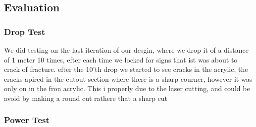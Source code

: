 \subsection{Evaluation}
\subsubsection{Drop Test}
We did testing on the last iteration of our desgin, where we drop it of a distance of 1 meter 10 times, efter each time we locked for signs that ist was about to crack of fracture.
efter the 10'th drop we started to see cracks in the acrylic, the cracks apired in the cutout section where there is a sharp courner, however it was only on in the fron acrylic. 
This i properly due to the laser cutting, and could be avoid by making a round cut rathere that a sharp cut

\subsubsection{Power Test}



